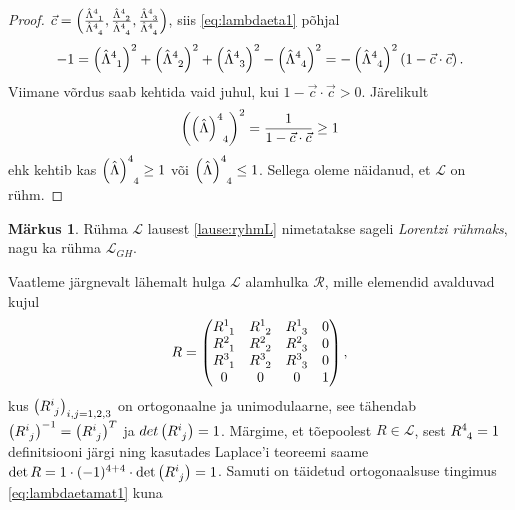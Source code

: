 \documentclass[a4paper,12pt]{article}
\theoremstyle{plain}
\theoremstyle{definition}
\newtheorem{markus}{Märkus}[section]
\numberwithin{equation}{section}
\def\L{{\mathcal L}}
\begin{document}
\begin{proof}
$\vec{c} = \left(\frac{\hat{\Lambda}\indices{^4_1}}{\hat{\Lambda}\indices{^4_4}}, \frac{\hat{\Lambda}\indices{^4_2}}{\hat{\Lambda}\indices{^4_4}}, \frac{\hat{\Lambda}\indices{^4_3}}{\hat{\Lambda}\indices{^4_4}}\right)$, 
siis \ref{eq:lambdaeta1} põhjal
\[ -1 = \left(\hat{\Lambda}\indices{^4_1}\right)^2 + \left(\hat{\Lambda}\indices{^4_2}\right)^2 + \left(\hat{\Lambda}\indices{^4_3}\right)^2 - \left(\hat{\Lambda}\indices{^4_4}\right)^2 = - \left(\hat{\Lambda}\indices{^4_4}\right)^2 \left(1 - \vec{c} \cdot \vec{c}\right). \]
Viimane võrdus saab kehtida vaid juhul, kui $1 - \vec{c} \cdot \vec{c} > 0$. Järelikult
\[\left(\left(\hat{\Lambda}\right)\indices{^4_4}\right)^2 = \frac{1}{1 - \vec{c}\cdot\vec{c}} \geq 1\]
ehk kehtib kas $\left(\hat{\Lambda}\right)\indices{^4_4} \geq 1$ või $\left(\hat{\Lambda}\right)\indices{^4_4} \leq 1$. Sellega oleme näidanud, et $\L$ on rühm.
\end{proof}
\begin{markus}
Rühma $\L$ lausest \ref{lause:ryhmL} nimetatakse sageli \emph{Lorentzi rühmaks}, nagu ka rühma $\L_{GH}$.
\end{markus}
Vaatleme järgnevalt lähemalt hulga $\L$ alamhulka $\mathcal{R}$, mille elemendid avalduvad kujul
\[R = \begin{pmatrix}
R\indices{^1_1} & R\indices{^1_2} & R\indices{^1_3} & 0 \\ 
R\indices{^2_1} & R\indices{^2_2} & R\indices{^2_3} & 0 \\  
R\indices{^3_1} & R\indices{^3_2} & R\indices{^3_3} & 0 \\ 
0 & 0 & 0 & 1 \\ 
\end{pmatrix},\]
kus $\left(R\indices{^i_j}\right)_{i,j = 1,2,3}$ on ortogonaalne ja unimodulaarne, see tähendab $\left(R\indices{^i_j}\right)^{-1} = \left(R\indices{^i_j}\right)^T$ ja $det \left(R\indices{^i_j}\right) = 1$. Märgime, et tõepoolest $R \in \L$, sest $R\indices{^4_4} = 1$ definitsiooni järgi ning kasutades Laplace'i teoreemi saame $\det R = 1 \cdot (-1)^{4+4} \cdot \det \left(R\indices{^i_j}\right) = 1$. Samuti on täidetud ortogonaalsuse tingimus \ref{eq:lambdaetamat1} kuna
\end{document}
